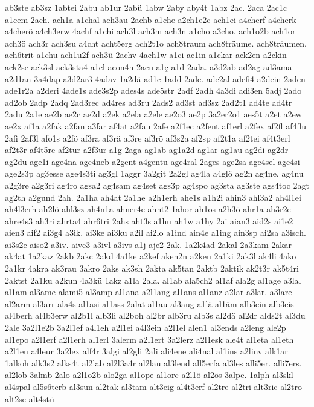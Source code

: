{ab3ste
ab3sz
1abtei
2abu
ab1ur
2abü
1abw
2aby
aby4t
1abz
2ac.
2aca
2ac1c
a1cem
2ach.
ach1a
a1chal
ach3au
2achb
a1che
a2ch1e2c
ach1ei
a4cherf
a4cherk
a4cherö
a4ch3erw
4achf
a1chi
ach3l
ach3m
ach3n
a1cho
a3cho.
ach1o2b
ach1or
ach3ö
ach3r
ach3su
a4cht
acht5erg
ach2t1o
ach8traum
ach8träume.
ach8träumen.
ach6trit
a1chu
ach1u2f
ach3ü
2achv
4ach1w
a1ci
ac1in
a1ckar
ack2en
a2ckin
ack2se
ack3sl
ack3sta4
a1cl
acon4n
2acu
a1ç
a1d
2ada.
a3d2ab
ad2ag
ad3ama
a2d1an
3a4dap
a3d2ar3
4adav
1a2dä
ad1c
1add
2ade.
ade2al
adefi4
a2dein
2aden
ade1r2a
a2deri
4ade1s
ade3s2p
ades4s
ade5str
2adf
2adh
4a3di
adi3en
5adj
2ado
ad2ob
2adp
2adq
2ad3rec
ad4res
ad3ru
2ads2
ad3st
ad3sz
2ad2t1
ad4te
ad4tr
2adu
2a1e
ae2b
ae2c
ae2d
a2ek
a2ela
a2ele
ae2o3
ae2p
3a2er2o1
aes5t
a2et
a2ew
ae2x
af1a
a2fak
a2fan
a3far
af4at
a2fau
2afe
a2f1ec
a2fent
af1erl
a2fex
af2fl
af4flu
2afi
2af3l
afo1s
a2fö
af3ra
af3rä
af3re
af3rö
af3s2a
af2sp
af2t1a
af2tei
af4t3erl
af2t3r
af4t5re
af2tur
a2f3ur
a1g
2aga
ag1ab
ag1a2d
ag1ar
ag1au
ag2di
ag2dr
ag2du
age1i
age4na
age4neb
a2gent
a4gentu
age4ral
2ages
age2sa
age4sel
age4si
age2s3p
ag3esse
age4s3ti
ag3gl
1aggr
3a2git
2a2gl
ag4la
a4glö
ag2n
ag4ne.
ag4nu
a2g3re
a2g3ri
ag4ro
agsa2
ag4sam
ag4set
ags3p
ag4spo
ag3sta
ag3ste
ags4toc
2agt
ag2th
a2gund
2ah.
2a1ha
ah4at
2a1he
a2h1erh
ahe1s
a1h2i
ahin3
ahl3a2
ah4l1ei
ah4l3erh
ah2lö
ahl3sz
ah4n1a
ahner4e
ahnt2
1ahor
ah1os
a2h3ö
ahr1a
ah3r2e
ahre4s3
ah3ri
ahrta4
ahr6tri
2ahs
aht3s
a1hu
ah1w
a1hy
2ai
aian3
aid2s
ai1e2
aien3
aif2
ai3g4
a3ik.
ai3ke
ai3ku
a2il
ai2lo
a1ind
ain4e
a1ing
ain3sp
ai2sa
a3isch.
ai3s2e
aiso2
a3iv.
aive3
a3ivl
a3ivs
a1j
aje2
2ak.
1a2k4ad
2akal
2a3kam
2akar
ak4at
1a2kaz
2akb
2akc
2akd
4a1ke
a2kef
aken2n
a2keu
2a1ki
2ak3l
ak4li
4ako
2a1kr
4akra
ak3rau
3akro
2aks
ak3sh
2akta
ak5tan
2aktb
2aktik
ak2t3r
ak5t4ri
2aktst
2a1ku
a2kun
4a3kü
1akz
a1la
2ala.
al1ab
ala5ch2
al1af
ala2g
al1age
a3lal
al1am
al3ame
alami5
al3amp
al1ana
a2l1ang
al1ans
al1anz
a2lar
a3lar.
a3lare
al2arm
al3arr
ala4s
al1asi
al1ass
2alat
al1au
al3aug
a1lä
al1äm
alb3ein
alb3eis
al4berh
al4b3erw
al2b1l
alb3li
al2boh
al2br
alb3ru
alb3s
al2dä
al2dr
alds2t
al3du
2ale
3a2l1e2b
3a2l1ef
a4l1eh
a2l1ei
a4l3ein
a2l1el
alen1
al3ends
a2leng
ale2p
al1epo
a2l1erf
a2l1erh
al1erl
3alerm
a2l1ert
3a2lerz
a2l1esk
ale4t
al1eta
al1eth
a2l1eu
a4leur
3a2lex
alf4r
3algi
al2gli
2ali
ali4ene
ali4nal
al1ins
a2linv
alk1ar
1alkoh
alk3s2
alks4t
al2lab
al2l3a4r
al2lau
al3lend
all5erfa
al3les
alli5er.
alli7ers.
al2lob
3almb
2alo
a2l1o2b
alo2ga
al1ope
al1orc
a2l1ö
al2ös
3alpe.
1alph
al3skl
al4spal
al5s6terb
al3sun
al2tak
al3tam
alt3eig
al4t3erf
al2tre
al2tri
alt3ric
al2tro
alt2se
alt4stü
}
